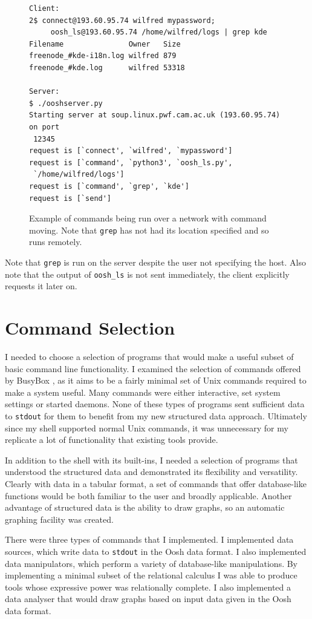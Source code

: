 \documentclass[12pt,twoside,notitlepage]{report}
\begin{document}
\begin{figure}
\begin{Verbatim}[frame=single,framerule=0.2pt,framesep=5pt]
Client:
2$ connect@193.60.95.74 wilfred mypassword;
     oosh_ls@193.60.95.74 /home/wilfred/logs | grep kde
Filename               Owner   Size
freenode_#kde-i18n.log wilfred 879
freenode_#kde.log      wilfred 53318

Server:
$ ./ooshserver.py
Starting server at soup.linux.pwf.cam.ac.uk (193.60.95.74) on port
 12345
request is [`connect', `wilfred', `mypassword']
request is [`command', `python3', `oosh_ls.py',
 `/home/wilfred/logs']
request is [`command', `grep', `kde']
request is [`send']
\end{Verbatim}
  \caption{Example of commands being run over a network with command
    moving. Note that {\tt grep} has not had its location specified
    and so runs remotely.}
  \label{grepexample}
\end{figure}

Note that {\tt grep} is run on the server despite the user not specifying
the host. Also note that the output of {\tt oosh\_ls} is not sent
immediately, the client explicitly requests it later on.

\section{Command Selection}
I needed to choose a selection of programs that would make a useful
subset of basic command line functionality. I examined the selection
of commands offered by BusyBox \cite{busybox}, as it aims to be a
fairly minimal set of Unix commands required to make a system
useful. Many commands were either interactive, set system settings or
started daemons. None of these types of programs sent sufficient data
to {\tt stdout} for them to benefit from my new structured data
approach. Ultimately since my shell supported normal Unix commands, it
was unnecessary for my replicate a lot of functionality that existing
tools provide.

In addition to the shell with its built-ins, I needed a selection of
programs that understood the structured data and demonstrated its
flexibility and versatility. Clearly with data in a tabular format, a
set of commands that offer database-like functions would be both
familiar to the user and broadly applicable. Another advantage
of structured data is the ability to draw graphs, so an automatic
graphing facility was created.

There were three types of commands that I implemented. I implemented
data sources, which write data to {\tt stdout} in the Oosh data
format. I also implemented data manipulators, which perform a variety
of database-like manipulations. By implementing a minimal subset of
the relational calculus I was able to produce tools whose expressive
power was relationally complete. I also implemented a data analyser
that would draw graphs based on input data given in the Oosh data
format.
\end{document}
